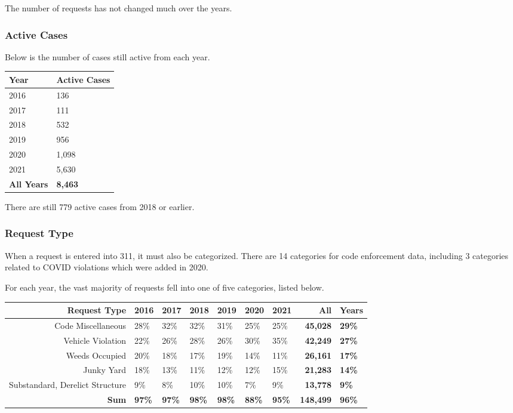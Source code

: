 \documentclass[
]{book}
\begin{document}
The number of requests has not changed much over the years.

\hypertarget{active-cases}{%
\subsubsection{Active Cases}\label{active-cases}}

Below is the number of cases still active from each year.

\begin{longtable}[]{@{}ll@{}}
\toprule
Year & Active Cases \\
\midrule
\endhead
2016 & 136 \\
2017 & 111 \\
2018 & 532 \\
2019 & 956 \\
2020 & 1,098 \\
2021 & 5,630 \\
\textbf{All Years} & \textbf{8,463} \\
\bottomrule
\end{longtable}

There are still 779 active cases from 2018 or earlier.

\hypertarget{request-type}{%
\subsubsection{Request Type}\label{request-type}}

When a request is entered into 311, it must also be categorized. There are 14 categories for code enforcement data, including 3 categories related to COVID violations which were added in 2020.

For each year, the vast majority of requests fell into one of five categories, listed below.

\begin{longtable}[]{@{}rllllllrl@{}}
\toprule
Request Type & 2016 & 2017 & 2018 & 2019 & 2020 & 2021 & All & Years \\
\midrule
\endhead
Code Miscellaneous & 28\% & 32\% & 32\% & 31\% & 25\% & 25\% & \textbf{45,028} & \textbf{29\%} \\
Vehicle Violation & 22\% & 26\% & 28\% & 26\% & 30\% & 35\% & \textbf{42,249} & \textbf{27\%} \\
Weeds Occupied & 20\% & 18\% & 17\% & 19\% & 14\% & 11\% & \textbf{26,161} & \textbf{17\%} \\
Junky Yard & 18\% & 13\% & 11\% & 12\% & 12\% & 15\% & \textbf{21,283} & \textbf{14\%} \\
Substandard, Derelict Structure & 9\% & 8\% & 10\% & 10\% & 7\% & 9\% & \textbf{13,778} & \textbf{9\%} \\
\textbf{Sum} & \textbf{97\%} & \textbf{97\%} & \textbf{98\%} & \textbf{98\%} & \textbf{88\%} & \textbf{95\%} & \textbf{148,499} & \textbf{96\%} \\
\bottomrule
\end{longtable}
\end{document}
